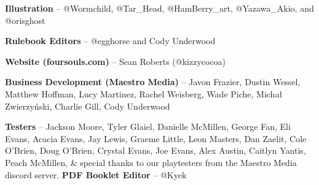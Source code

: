 \documentclass[a4paper, twoside]{report} %
\begin{document}
    \textbf{Illustration} – @Wormchild, @Tar\_Head, @HamBerry\_art, @Yazawa\_Akio, and @orisghost
    
    \textbf{Rulebook Editors} – @egghorse and Cody Underwood
    
    \textbf{Website (foursouls.com)} – Sean Roberts (@kizzycocoa)
    
    \textbf{Business Development (Maestro Media)} – Javon Frazier, Dustin Wessel, Matthew Hoffman, Lucy Martinez, Rachel Weisberg, Wade Piche, Michał Zwierzyński, Charlie Gill, Cody Underwood
    
    \textbf{Testers} – Jackson Moore, Tyler Glaiel, Danielle McMillen, George Fan, Eli Evans, Acacia Evans, Jay Lewis, Graeme Little, Leon Masters, Dan Zaelit, Cole O’Brien, Doug O’Brien, Crystal Evans, Joe Evans, Alex Austin, Caitlyn Yantis, Peach McMillen, \& special thanks to our playtesters from the Maestro Media discord server.
    \vfill
    \textbf{PDF Booklet Editor} – @Kyek
\end{document}
